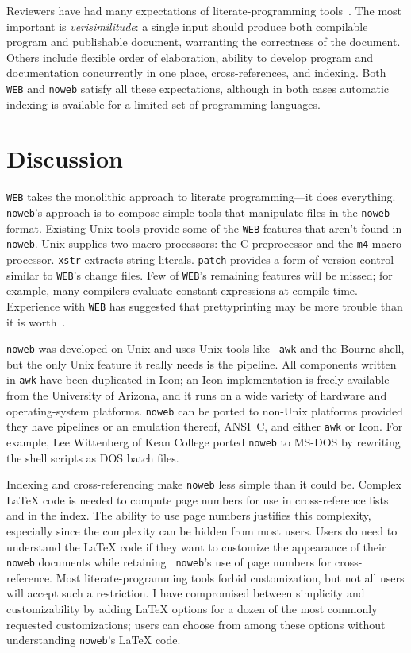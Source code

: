Reviewers have had many expectations of literate-programming
tools~\cite{thimbleby:review,cvw:assessment}.
The most important is {\em verisimilitude}: a single
input should produce both compilable program and publishable document,
warranting the correctness of the document.
Others include flexible order of elaboration,
ability to develop program and documentation concurrently in one
place, cross-references, and indexing.
Both {\tt WEB} and {\tt noweb}
satisfy all these expectations, although in both cases automatic
indexing is available for a limited set of programming languages.


\section{Discussion}

{\tt WEB} takes the monolithic approach to literate programming---it
does everything.
{\tt noweb}'s approach is to compose
simple tools that manipulate files in the {\tt noweb} format. 
Existing Unix tools provide some of the {\tt WEB} features that
aren't found in \verb+noweb+.
Unix supplies two macro processors: the C
preprocessor and the \verb+m4+ macro processor.
\verb+xstr+ extracts string literals.
\verb+patch+ provides a form of version control similar to {\tt WEB}'s
change files.
Few of {\tt WEB}'s remaining features will be missed; for example, many compilers
evaluate constant expressions at compile time.
Experience with {\tt WEB} has suggested that prettyprinting may be
more trouble than it is worth~\cite{ramsey:literate}.

{\tt noweb} was developed on Unix and uses Unix tools like {\tt
awk} and the Bourne shell, but the only Unix feature it really needs
is the pipeline.
All components written in {\tt awk} have been duplicated in Icon; 
an Icon implementation is freely available from the University of Arizona, and
it runs on a wide variety of hardware and operating-system platforms.
{\tt noweb} can be ported to non-Unix platforms provided they have
pipelines or an emulation thereof, ANSI~C, and either {\tt awk} or Icon.
For example, 
Lee Wittenberg of Kean College ported {\tt noweb} to MS-DOS by
rewriting the shell scripts as DOS batch files.

Indexing and cross-referencing make
{\tt noweb} less simple than it could be.
Complex {\LaTeX} code is needed to compute page numbers for use in
cross-reference lists and in the index.
The ability to use page numbers justifies this complexity, especially
since the complexity can be hidden from most users.
Users do need to understand the {\LaTeX} code if they want to customize the
appearance of their {\tt noweb} documents while retaining {\tt
noweb}'s use of page numbers for cross-reference.
Most literate-programming tools
forbid customization, but not all users will accept such a restriction.
I have compromised between simplicity and customizability by adding
{\LaTeX} options for a dozen of the most commonly requested
customizations; users can choose from among these options without
understanding {\tt noweb}'s {\LaTeX} code.


